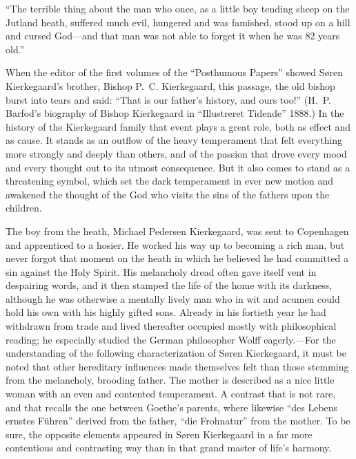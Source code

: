 \documentclass[12pt,a4paper]{book}
\newcommand{\opage}[1]{\marginnote{\footnotesize\textit{[#1]}}}
\begin{document}
``The terrible thing about the man who once, as a little boy tending sheep
on the Jutland heath, suffered much evil, hungered and was famished, stood
up on a hill and cursed God---and that man was not able to forget it when
he was 82 years old.''

When the editor of the first volumes of the ``Posthumous Papers'' showed
Søren Kierkegaard's brother, Bishop P.~C. Kierkegaard, this passage, the
old bishop burst into tears and said: ``That is our father's history, and
ours too!'' (H.~P. Barfod's biography of Bishop Kierkegaard in
``Illustreret Tidende'' 1888.) In the history of the Kierkegaard family
that event plays a great role, both as effect and as cause. It stands as
an outflow of the heavy temperament that felt everything more strongly
and deeply than others, and of the passion that drove every mood and
every thought out to its utmost consequence. But it also comes to stand
as a threatening symbol, which set the dark temperament in ever new
motion and awakened the thought of the God who visits the sins of the
fathers upon the children.

The boy from the heath, Michael Pedersen Kierkegaard, was sent to
Copenhagen and apprenticed to a hosier. He worked his way up to becoming
a rich man, but never forgot that moment on the heath in which he
believed he had committed a sin against the Holy Spirit. His melancholy
dread often gave itself vent in despairing words, and it then stamped the
life of the home with its darkness,
\opage{30}although he was otherwise a mentally lively man who in wit and
acumen could hold his own with his highly gifted sons. Already in his
fortieth year he had withdrawn from trade and lived thereafter occupied
mostly with philosophical reading; he especially studied the German
philosopher Wolff eagerly.---For the understanding of the following
characterization of Søren Kierkegaard, it must be noted that other
hereditary influences made themselves felt than those stemming from the
melancholy, brooding father. The mother is described as a nice little
woman with an even and contented temperament. A contrast that is not
rare, and that recalls the one between Goethe's parents, where likewise
``des Lebens ernstes Führen'' derived from the father, ``die Frohnatur''
from the mother. To be sure, the opposite elements appeared in Søren
Kierkegaard in a far more contentious and contrasting way than in that
grand master of life's harmony.
\end{document}
